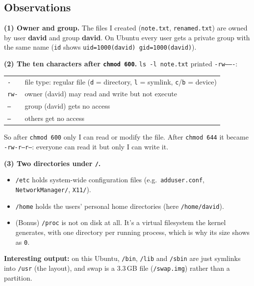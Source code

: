 \documentclass[12pt]{article}
\begin{document}
\subsection*{Observations}
\textbf{(1) Owner and group.} The files I created (\texttt{note.txt}, \texttt{renamed.txt}) are owned by user \textbf{david} and group \textbf{david}. On Ubuntu every user gets a private group with the same name (\texttt{id} shows \texttt{uid=1000(david) gid=1000(david)}).

\textbf{(2) The ten characters after \texttt{chmod 600}.} \texttt{ls -l note.txt} printed \texttt{-rw-------}:
\begin{center}
\begin{tabular}{ll}
\hline
\texttt{-} & file type: regular file (\texttt{d} = directory, \texttt{l} = symlink, \texttt{c}/\texttt{b} = device) \\
\texttt{rw-} & owner (david) may read and write but not execute \\
\texttt{---} & group (david) gets no access \\
\texttt{---} & others get no access \\
\hline
\end{tabular}
\end{center}
So after \texttt{chmod 600} only I can read or modify the file. After \texttt{chmod 644} it became \texttt{-rw-r--r--}: everyone can read it but only I can write it.

\textbf{(3) Two directories under \texttt{/}.}
\begin{itemize}
    \item \texttt{/etc} holds system-wide configuration files (e.g.\ \texttt{adduser.conf}, \texttt{NetworkManager/}, \texttt{X11/}).
    \item \texttt{/home} holds the users' personal home directories (here \texttt{/home/david}).
    \item (Bonus) \texttt{/proc} is not on disk at all. It's a virtual filesystem the kernel generates, with one directory per running process, which is why its size shows as \texttt{0}.
\end{itemize}

\textbf{Interesting output:} on this Ubuntu, \texttt{/bin}, \texttt{/lib} and \texttt{/sbin} are just symlinks into \texttt{/usr} (the  layout), and swap is a 3.3\,GB file (\texttt{/swap.img}) rather than a partition.
\end{document}

